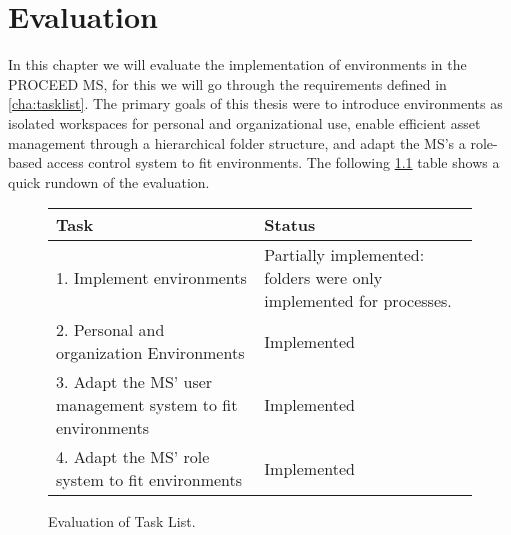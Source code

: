 \chapter{Evaluation}
\label{cha:evaluation}

In this chapter we will evaluate the implementation of environments in the PROCEED MS,
for this we will go through the requirements defined in \ref{cha:tasklist}.
The primary goals of this thesis were to introduce environments as isolated workspaces for personal and organizational use,
enable efficient asset management through a hierarchical folder structure,
and adapt the MS's a role-based access control system to fit environments.
The following \ref{fig:quick-evaluation} table shows a quick rundown of the evaluation.


\begin{figure}[H]
	\centering

	\begin{tabular}{ | m{20em} | m{17em}| }
		\hline
		 Task & Status \\
     \hline
      1. Implement environments &  Partially implemented: folders were only implemented for processes. \\
     \hline
      2. Personal and organization Environments &  Implemented \\
     \hline
      3. Adapt the MS' user management system to fit environments &  Implemented \\
     \hline
      4. Adapt the MS' role system to fit environments &  Implemented \\
     \hline
	\end{tabular}

	\caption{Evaluation of Task List.}
	\label{fig:quick-evaluation}
\end{figure}

